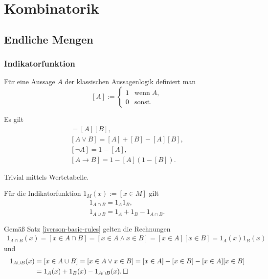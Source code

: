 
\chapter{Kombinatorik}

\section{Endliche Mengen}

\subsection{Indikatorfunktion}

\begin{Definition}\newlinefirst
Für eine Aussage $A$ der klassischen Aussagenlogik definiert man
\[[A] := \begin{cases}
1 &\text{wenn}\;A,\\
0 &\text{sonst}.
\end{cases}\]
\end{Definition}

\begin{Satz}\label{iverson-basic-rules}
Es gilt
\begin{gather*}
[A\land B] = [A][B],\\
[A\lor B] = [A]+[B]-[A][B],\\
[\neg A] = 1-[A],\\
[A\to B] = 1-[A](1-[B]).
\end{gather*}
\end{Satz}
\begin{Beweis} Trivial mittels Wertetabelle.\,\qedsymbol
\end{Beweis}

\begin{Satz}\label{indicator-set-op}
Für die Indikatorfunktion $1_M(x):=[x\in M]$ gilt
\begin{gather*}
1_{A\cap B} = 1_A 1_B,\\
1_{A\cup B} = 1_A + 1_B - 1_{A\cap B}.
\end{gather*}
\end{Satz}
\begin{Beweis}
Gemäß Satz \ref{iverson-basic-rules} gelten die
Rechnungen
\begin{align*}
1_{A\cap B}(x) = [x\in A\cap B]
= [x\in A\land x\in B] = [x\in A][x\in B] = 1_A(x)1_B(x)
\end{align*}
und
\begin{align*}
1_{A\cup B}(x) &= [x\in A\cup B] = [x\in A\lor x\in B]
= [x\in A] + [x\in B] - [x\in A][x\in B]\\
&= 1_A(x) + 1_B(x) - 1_{A\cap B}(x).\,\square
\end{align*}
\end{Beweis}

